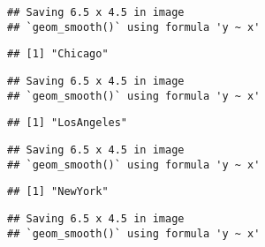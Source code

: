 \documentclass[
]{article}
\begin{document}
\begin{verbatim}
## Saving 6.5 x 4.5 in image
## `geom_smooth()` using formula 'y ~ x'
\end{verbatim}

\begin{verbatim}
## [1] "Chicago"
\end{verbatim}

\begin{verbatim}
## Saving 6.5 x 4.5 in image
## `geom_smooth()` using formula 'y ~ x'
\end{verbatim}

\begin{verbatim}
## [1] "LosAngeles"
\end{verbatim}

\begin{verbatim}
## Saving 6.5 x 4.5 in image
## `geom_smooth()` using formula 'y ~ x'
\end{verbatim}

\begin{verbatim}
## [1] "NewYork"
\end{verbatim}

\begin{verbatim}
## Saving 6.5 x 4.5 in image
## `geom_smooth()` using formula 'y ~ x'
\end{verbatim}
\end{document}
